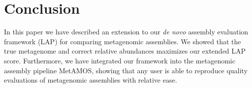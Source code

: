 


\section{Conclusion}
In this paper we have described an extension to our \emph{de novo} assembly evaluation framework (LAP) for comparing metagenomic assemblies.
We showed that the true metagenome and correct relative abundances maximizes our extended LAP score.
Furthermore, we have integrated our framework into the metagenomic assembly pipeline MetAMOS, showing that any user is able to reproduce quality evaluations of metagenomic assemblies with relative ease.


